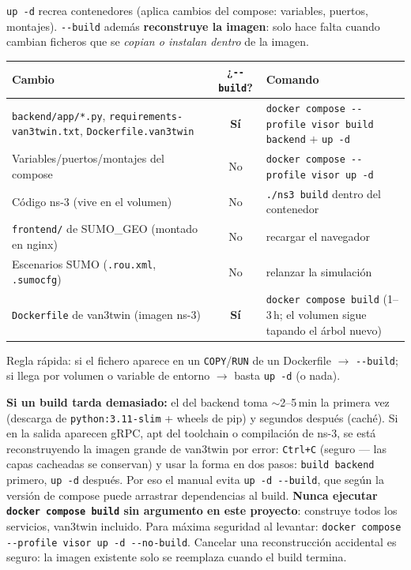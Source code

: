 \documentclass[11pt,a4paper]{article}
\begin{document}
\texttt{up -d} recrea contenedores (aplica cambios del compose: variables,
puertos, montajes). \texttt{-{}-build} además \textbf{reconstruye la imagen}:
solo hace falta cuando cambian ficheros que se \emph{copian o instalan dentro}
de la imagen.

\begin{center}
\small
\begin{tabular}{@{}p{}cp{}@{}}
\toprule
\textbf{Cambio} & \textbf{¿\texttt{-{}-build}?} & \textbf{Comando} \\
\midrule
\texttt{backend/app/*.py}, \texttt{requirements-van3twin.txt}, \texttt{Dockerfile.van3twin} & \textbf{Sí} & \texttt{docker compose -{}-profile visor build backend} $+$ \texttt{up -d} \\
Variables/puertos/montajes del compose & No & \texttt{docker compose -{}-profile visor up -d} \\
Código ns-3 (vive en el volumen) & No & \texttt{./ns3 build} dentro del contenedor \\
\texttt{frontend/} de SUMO\_GEO (montado en nginx) & No & recargar el navegador \\
Escenarios SUMO (\texttt{.rou.xml}, \texttt{.sumocfg}) & No & relanzar la simulación \\
\texttt{Dockerfile} de van3twin (imagen ns-3) & \textbf{Sí} & \texttt{docker compose build} (1--3\,h; el volumen sigue tapando el árbol nuevo) \\
\bottomrule
\end{tabular}
\end{center}

Regla rápida: si el fichero aparece en un \texttt{COPY}/\texttt{RUN} de un
Dockerfile $\rightarrow$ \texttt{-{}-build}; si llega por volumen o variable
de entorno $\rightarrow$ basta \texttt{up -d} (o nada).

\begin{advertenciabox}
\textbf{Si un build tarda demasiado:} el del backend toma $\sim$2--5\,min la
primera vez (descarga de \texttt{python:3.11-slim} + wheels de pip) y segundos
después (caché). Si en la salida aparecen gRPC, apt del toolchain o
compilación de ns-3, se está reconstruyendo la imagen grande de van3twin por
error: \texttt{Ctrl+C} (seguro --- las capas cacheadas se conservan) y usar la
forma en dos pasos: \texttt{build backend} primero, \texttt{up -d} después.
Por eso el manual evita \texttt{up -d -{}-build}, que según la versión de
compose puede arrastrar dependencias al build. \textbf{Nunca ejecutar
\texttt{docker compose build} sin argumento en este proyecto}: construye
todos los servicios, van3twin incluido. Para máxima seguridad al levantar:
\texttt{docker compose -{}-profile visor up -d -{}-no-build}. Cancelar una
reconstrucción accidental es seguro: la imagen existente solo se reemplaza
cuando el build termina.
\end{advertenciabox}
\end{document}
